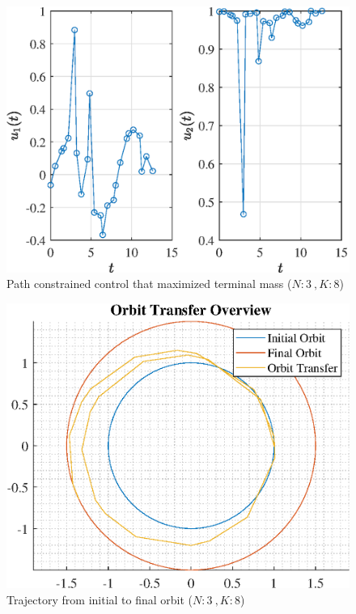 \documentclass[]{article}
\begin{document}
\begin{figure}
	\centering
	\includegraphics[scale=0.75]{path_N3_K8_C3_mf.eps}
	\caption{Path constrained control that maximized terminal mass (\(N:3\ , K:8\))}
	\label{fig:path_N3_K8_C3_mf}
\end{figure}
\begin{figure}
	\centering
	\includegraphics[scale=0.75]{orbit_N3_K8_C3_mf.eps}
	\caption{Trajectory from initial to final orbit (\(N:3\ , K:8\))}
	\label{fig:orbit_N3_K8_C3_mf}
\end{figure}
\end{document}
